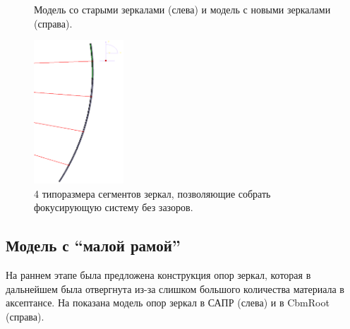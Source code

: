 \begin{figure}[H]
\begin{minipage}[b]{0.495\textwidth}
\end{minipage}
\caption{Модель со старыми зеркалами (слева) и модель с новыми зеркалами (справа).}
\label{fig:MCgeoMirrorsEvolution}
\end{figure}

\begin{figure}[H]
\centering
\includegraphics[width=0.3\textwidth]{pictures/Mirrors_4types_of_segments.png}
\caption{4 типоразмера сегментов зеркал, позволяющие собрать фокусирующую систему без зазоров.}
\label{fig:Mirrors4types}
\end{figure}

\subsection{Модель с ``малой рамой''}\label{sec:secModelWithSmallFrame}

На раннем этапе была предложена конструкция опор зеркал, которая в дальнейшем была отвергнута из-за слишком большого количества материала в аксептансе. На  показана модель опор зеркал в САПР (слева) и в CbmRoot (справа).

